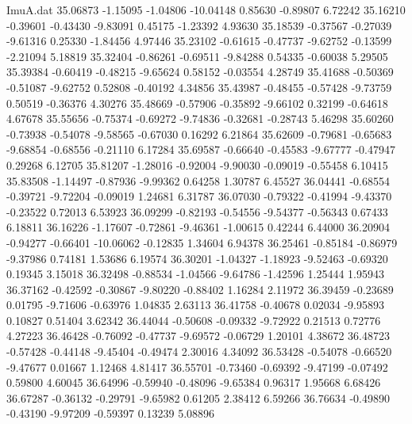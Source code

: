 \begin{filecontents}{ImuA.dat}
  35.06873   -1.15095   -1.04806  -10.04148    0.85630   -0.89807    6.72242
  35.16210   -0.39601   -0.43430   -9.83091    0.45175   -1.23392    4.93630
  35.18539   -0.37567   -0.27039   -9.61316    0.25330   -1.84456    4.97446
  35.23102   -0.61615   -0.47737   -9.62752   -0.13599   -2.21094    5.18819
  35.32404   -0.86261   -0.69511   -9.84288    0.54335   -0.60038    5.29505
  35.39384   -0.60419   -0.48215   -9.65624    0.58152   -0.03554    4.28749
  35.41688   -0.50369   -0.51087   -9.62752    0.52808   -0.40192    4.34856
  35.43987   -0.48455   -0.57428   -9.73759    0.50519   -0.36376    4.30276
  35.48669   -0.57906   -0.35892   -9.66102    0.32199   -0.64618    4.67678
  35.55656   -0.75374   -0.69272   -9.74836   -0.32681   -0.28743    5.46298
  35.60260   -0.73938   -0.54078   -9.58565   -0.67030    0.16292    6.21864
  35.62609   -0.79681   -0.65683   -9.68854   -0.68556   -0.21110    6.17284
  35.69587   -0.66640   -0.45583   -9.67777   -0.47947    0.29268    6.12705
  35.81207   -1.28016   -0.92004   -9.90030   -0.09019   -0.55458    6.10415
  35.83508   -1.14497   -0.87936   -9.99362    0.64258    1.30787    6.45527
  36.04441   -0.68554   -0.39721   -9.72204   -0.09019    1.24681    6.31787
  36.07030   -0.79322   -0.41994   -9.43370   -0.23522    0.72013    6.53923
  36.09299   -0.82193   -0.54556   -9.54377   -0.56343    0.67433    6.18811
  36.16226   -1.17607   -0.72861   -9.46361   -1.00615    0.42244    6.44000
  36.20904   -0.94277   -0.66401  -10.06062   -0.12835    1.34604    6.94378
  36.25461   -0.85184   -0.86979   -9.37986    0.74181    1.53686    6.19574
  36.30201   -1.04327   -1.18923   -9.52463   -0.69320    0.19345    3.15018
  36.32498   -0.88534   -1.04566   -9.64786   -1.42596    1.25444    1.95943
  36.37162   -0.42592   -0.30867   -9.80220   -0.88402    1.16284    2.11972
  36.39459   -0.23689    0.01795   -9.71606   -0.63976    1.04835    2.63113
  36.41758   -0.40678    0.02034   -9.95893    0.10827    0.51404    3.62342
  36.44044   -0.50608   -0.09332   -9.72922    0.21513    0.72776    4.27223
  36.46428   -0.76092   -0.47737   -9.69572   -0.06729    1.20101    4.38672
  36.48723   -0.57428   -0.44148   -9.45404   -0.49474    2.30016    4.34092
  36.53428   -0.54078   -0.66520   -9.47677    0.01667    1.12468    4.81417
  36.55701   -0.73460   -0.69392   -9.47199   -0.07492    0.59800    4.60045
  36.64996   -0.59940   -0.48096   -9.65384    0.96317    1.95668    6.68426
  36.67287   -0.36132   -0.29791   -9.65982    0.61205    2.38412    6.59266
  36.76634   -0.49890   -0.43190   -9.97209   -0.59397    0.13239    5.08896

\end{filecontents}
